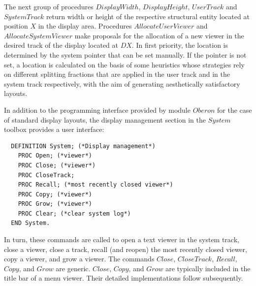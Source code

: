 The next group of procedures $DisplayWidth$, $DisplayHeight$, $UserTrack$ and $SystemTrack$ return
width or height of the respective structural entity located at position $X$ in the display area.
Procedures $AllocateUserViewer$ and $AllocateSystemViewer$ make proposals for the allocation of a
new viewer in the desired track of the display located at $DX$. In first priority, the location is
determined by the system pointer that can be set manually. If the pointer is not set, a location is
calculated on the basis of some heuristics whose strategies rely on different splitting fractions that
are applied in the user track and in the system track respectively, with the aim of generating
aesthetically satisfactory layouts.

In addition to the programming interface provided by module $Oberon$ for the case of standard
display layouts, the display management section in the $System$ toolbox provides a user interface:
\begin{verbatim}
  DEFINITION System; (*Display management*)
    PROC Open; (*viewer*)
    PROC Close; (*viewer*)
    PROC CloseTrack;
    PROC Recall; (*most recently closed viewer*)
    PROC Copy; (*viewer*)
    PROC Grow; (*viewer*)
    PROC Clear; (*clear system log*)
  END System.
\end{verbatim}
In turn, these commands are called to open a text viewer in the system track, close a viewer,
close a track, recall (and reopen) the most recently closed viewer, copy a viewer, and grow a
viewer. The commands $Close$, $CloseTrack$, $Recall$, $Copy$, and $Grow$ are generic. $Close$, $Copy$, and
$Grow$ are typically included in the title bar of a menu viewer. Their detailed implementations follow subsequently.
